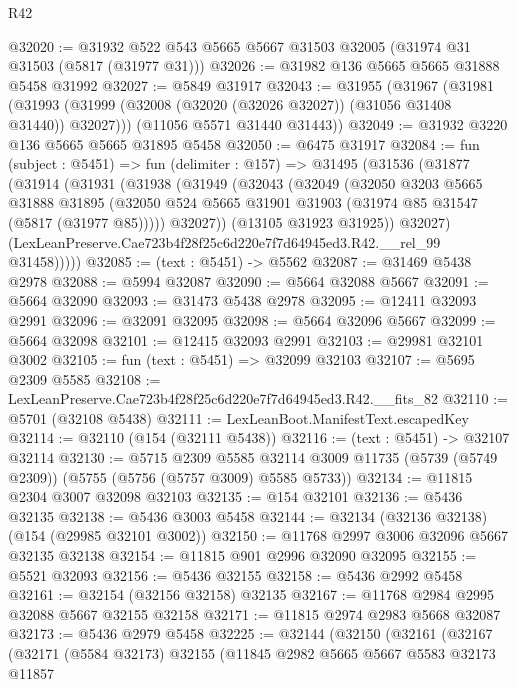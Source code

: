 \begin{lexlean}{R42}
\begin{coremodule}
@32020 := @31932 @522 @543 @5665 @5667 @31503 @32005 (@31974 @31 @31503 (@5817 (@31977 @31)))
@32026 := @31982 @136 @5665 @5665 @31888 @5458 @31992
@32027 := @5849 @31917
@32043 := @31955
    (@31967
      (@31981 (@31993 (@31999 (@32008 (@32020 (@32026 @32027)) (@31056 @31408 @31440)) @32027)))
      (@11056 @5571 @31440 @31443))
@32049 := @31932 @3220 @136 @5665 @5665 @31895 @5458
@32050 := @6475 @31917
@32084 := fun (subject : @5451) =>
  fun (delimiter : @157) =>
  @31495
    (@31536
      (@31877
        (@31914
          (@31931
            (@31938
              (@31949
                (@32043
                  (@32049
                    (@32050
                      @3203
                      @5665
                      @31888
                      @31895
                      (@32050 @524 @5665 @31901 @31903 (@31974 @85 @31547 (@5817 (@31977 @85)))))
                    @32027))
                (@13105 @31923 @31925))
              @32027)
            (LexLeanPreserve.Cae723b4f28f25c6d220e7f7d64945ed3.R42.__rel_99 @31458)))))
@32085 := (text : @5451) -> @5562
@32087 := @31469 @5438 @2978
@32088 := @5994 @32087
@32090 := @5664 @32088 @5667
@32091 := @5664 @32090
@32093 := @31473 @5438 @2978
@32095 := @12411 @32093 @2991
@32096 := @32091 @32095
@32098 := @5664 @32096 @5667
@32099 := @5664 @32098
@32101 := @12415 @32093 @2991
@32103 := @29981 @32101 @3002
@32105 := fun (text : @5451) => @32099 @32103
@32107 := @5695 @2309 @5585
@32108 := LexLeanPreserve.Cae723b4f28f25c6d220e7f7d64945ed3.R42.__fits_82
@32110 := @5701 (@32108 @5438)
@32111 := LexLeanBoot.ManifestText.escapedKey
@32114 := @32110 (@154 (@32111 @5438))
@32116 := (text : @5451) -> @32107 @32114
@32130 := @5715
    @2309
    @5585
    @32114
    @3009
    @11735
    (@5739 (@5749 @2309))
    (@5755 (@5756 (@5757 @3009) @5585 @5733))
@32134 := @11815 @2304 @3007 @32098 @32103
@32135 := @154 @32101
@32136 := @5436 @32135
@32138 := @5436 @3003 @5458
@32144 := @32134 (@32136 @32138) (@154 (@29985 @32101 @3002))
@32150 := @11768 @2997 @3006 @32096 @5667 @32135 @32138
@32154 := @11815 @901 @2996 @32090 @32095
@32155 := @5521 @32093
@32156 := @5436 @32155
@32158 := @5436 @2992 @5458
@32161 := @32154 (@32156 @32158) @32135
@32167 := @11768 @2984 @2995 @32088 @5667 @32155 @32158
@32171 := @11815 @2974 @2983 @5668 @32087
@32173 := @5436 @2979 @5458
@32225 := @32144
    (@32150
      (@32161
        (@32167
          (@32171
            (@5584 @32173)
            @32155
            (@11845
              @2982
              @5665
              @5667
              @5583
              @32173
              @11857

\end{coremodule}
\end{lexlean}
